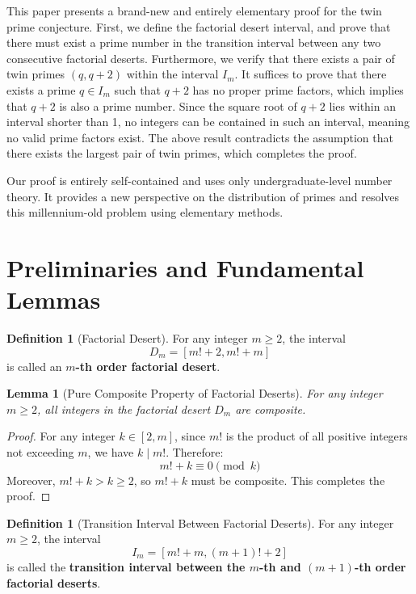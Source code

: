 \documentclass[12pt,letterpaper,reqno]{amsart}
\theoremstyle{plain}
\newtheorem{lemma}[theorem]{Lemma}
\theoremstyle{definition}
\newtheorem{definition}[theorem]{Definition}
\theoremstyle{remark}
\begin{document}
	This paper presents a brand-new and entirely elementary proof for the twin prime conjecture. First, we define the factorial desert interval, and prove that there must exist a prime number in the transition interval between any two consecutive factorial deserts. Furthermore, we verify that there exists a pair of twin primes $(q, q+2)$ within the interval $I_m$. It suffices to prove that there exists a prime $q \in I_m$ such that $q+2$ has no proper prime factors, which implies that $q+2$ is also a prime number. Since the square root of $q+2$ lies within an interval shorter than 1, no integers can be contained in such an interval, meaning no valid prime factors exist. The above result contradicts the assumption that there exists the largest pair of twin primes, which completes the proof.
	
	Our proof is entirely self-contained and uses only undergraduate-level number theory. It provides a new perspective on the distribution of primes and resolves this millennium-old problem using elementary methods.
	
	\section{Preliminaries and Fundamental Lemmas}
	
	\begin{definition}[Factorial Desert]
		For any integer $m \ge 2$, the interval
		\[
		D_m = [m!+2, m!+m]
		\]
		is called an \textbf{$m$-th order factorial desert}.
	\end{definition}
	
	\begin{lemma}[Pure Composite Property of Factorial Deserts]
		For any integer $m \ge 2$, all integers in the factorial desert $D_m$ are composite.
	\end{lemma}
	
	\begin{proof}
		For any integer $k \in [2, m]$, since $m!$ is the product of all positive integers not exceeding $m$, we have $k \mid m!$. Therefore:
		\[
		m!+k \equiv 0 \pmod{k}
		\]
		Moreover, $m!+k > k \ge 2$, so $m!+k$ must be composite. This completes the proof.
	\end{proof}
	
	\begin{definition}[Transition Interval Between Factorial Deserts]
		For any integer $m \ge 2$, the interval
		\[
		I_m = [m!+m, (m+1)!+2]
		\]
		is called the \textbf{transition interval between the $m$-th and $(m+1)$-th order factorial deserts}.
	\end{definition}
	
\end{document}
